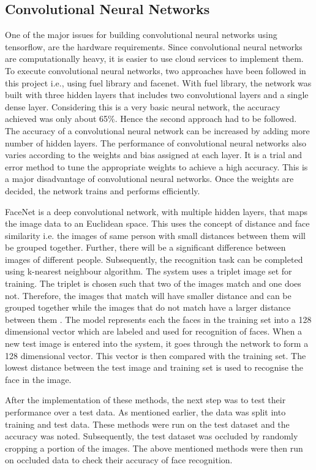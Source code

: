 \documentclass[conference]{IEEEtran}
\begin{document}
\subsection{Convolutional Neural Networks} 
\label{subsec: 4c Convolutional Neural Networks}
One of the major issues for building convolutional neural networks using tensorflow, are the hardware requirements. Since convolutional neural networks are computationally heavy, it is easier to use cloud services to implement them. To execute convolutional neural networks, two approaches have been followed in this project i.e., using fuel library and facenet\cite{schroff2015facenet}. With fuel library, the network was built with three hidden layers that includes two convolutional layers and a single dense layer. Considering this is a very basic neural network, the accuracy achieved was only about 65\%. Hence the second approach had to be followed. The accuracy of a convolutional neural network can be increased by adding more number of hidden layers. The performance of convolutional neural networks also varies according to the weights and bias assigned at each layer. It is a trial and error method to tune the appropriate weights to achieve a high accuracy. This is a major disadvantage of convolutional neural networks. Once the weights are decided, the network trains and performs efficiently. 

FaceNet is a deep convolutional network, with multiple hidden layers, that maps the image data to an Euclidean space. This uses the concept of distance and face similarity i.e. the images of same person with small distances between them will be grouped together. Further, there will be a significant difference between images of different people. Subsequently, the recognition task can be completed using k-nearest neighbour algorithm. The system uses a triplet image set for training. The triplet is chosen such that two of the images match and one does not. Therefore, the images that match will have smaller distance and can be grouped together while the images that do not match have a larger distance between them \cite{schroff2015facenet}. The model represents each the faces in the training set into a 128 dimensional vector which are labeled and used for recognition of faces. When a new test image is entered into the system, it goes through the network to form a 128 dimensional vector. This vector is then compared with the training set. The lowest distance between the test image and training set is used to recognise the face in the image. 

After the implementation of these methods, the next step was to test their performance over a test data. As mentioned earlier, the data was split into training and test data. These methods were run on the test dataset and the accuracy was noted. Subsequently, the test dataset was occluded by randomly cropping a portion of the images. The above mentioned methods were then run on occluded data to check their accuracy of face recognition.
\end{document}
